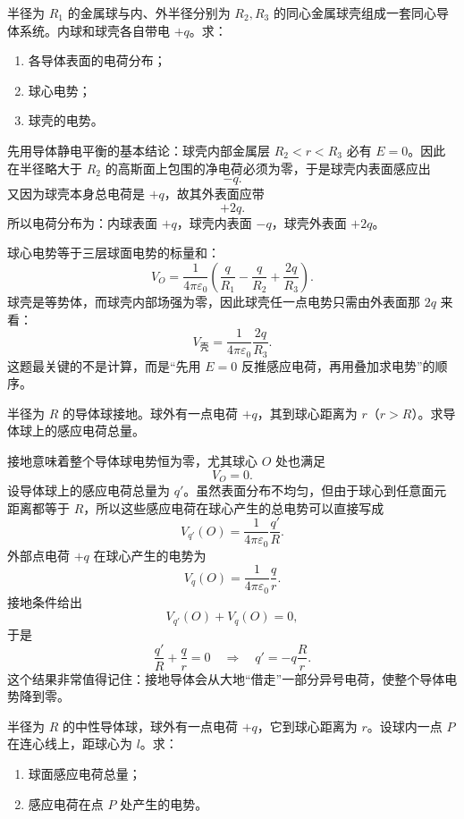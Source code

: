 \documentclass[lang=cn,11pt]{elegantbook}
\begin{document}
\begin{example}[同心金属球与金属球壳的电荷分布和电势]
半径为 \(R_1\) 的金属球与内、外半径分别为 \(R_2,R_3\) 的同心金属球壳组成一套同心导体系统。内球和球壳各自带电 \(+q\)。求：
\begin{enumerate}
  \item 各导体表面的电荷分布；
  \item 球心电势；
  \item 球壳的电势。
\end{enumerate}
\end{example}

\begin{solution}
先用导体静电平衡的基本结论：球壳内部金属层 \(R_2<r<R_3\) 必有 \(E=0\)。因此在半径略大于 \(R_2\) 的高斯面上包围的净电荷必须为零，于是球壳内表面感应出
\[
-q.
\]
又因为球壳本身总电荷是 \(+q\)，故其外表面应带
\[
+2q.
\]
所以电荷分布为：内球表面 \(+q\)，球壳内表面 \(-q\)，球壳外表面 \(+2q\)。

球心电势等于三层球面电势的标量和：
\[
V_O=\frac{1}{4\pi\varepsilon_0}\left(
\frac{q}{R_1}-\frac{q}{R_2}+\frac{2q}{R_3}
\right).
\]
球壳是等势体，而球壳内部场强为零，因此球壳任一点电势只需由外表面那 \(2q\) 来看：
\[
V_{\text{壳}}=\frac{1}{4\pi\varepsilon_0}\frac{2q}{R_3}.
\]
这题最关键的不是计算，而是“先用 \(E=0\) 反推感应电荷，再用叠加求电势”的顺序。
\end{solution}

\begin{example}[接地导体球附近点电荷诱导出的总电荷]
半径为 \(R\) 的导体球接地。球外有一点电荷 \(+q\)，其到球心距离为 \(r\)（\(r>R\)）。求导体球上的感应电荷总量。
\end{example}

\begin{solution}
接地意味着整个导体球电势恒为零，尤其球心 \(O\) 处也满足
\[
V_O=0.
\]
设导体球上的感应电荷总量为 \(q'\)。虽然表面分布不均匀，但由于球心到任意面元距离都等于 \(R\)，所以这些感应电荷在球心产生的总电势可以直接写成
\[
V_{q'}(O)=\frac{1}{4\pi\varepsilon_0}\frac{q'}{R}.
\]
外部点电荷 \(+q\) 在球心产生的电势为
\[
V_q(O)=\frac{1}{4\pi\varepsilon_0}\frac{q}{r}.
\]
接地条件给出
\[
V_{q'}(O)+V_q(O)=0,
\]
于是
\[
\frac{q'}{R}+\frac{q}{r}=0
\quad\Longrightarrow\quad
\boxed{q'=-q\frac{R}{r}}.
\]
这个结果非常值得记住：接地导体会从大地“借走”一部分异号电荷，使整个导体电势降到零。
\end{solution}

\begin{example}[不接地中性导体球附近点电荷的感应电势]
半径为 \(R\) 的中性导体球，球外有一点电荷 \(+q\)，它到球心距离为 \(r\)。设球内一点 \(P\) 在连心线上，距球心为 \(l\)。求：
\begin{enumerate}
  \item 球面感应电荷总量；
  \item 感应电荷在点 \(P\) 处产生的电势。
\end{enumerate}
\end{example}
\end{document}
